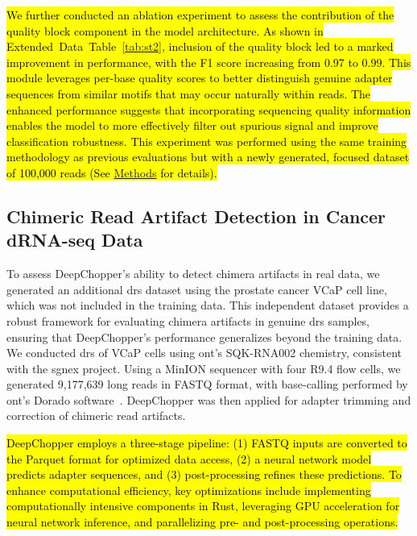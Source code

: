 \documentclass[pdflatex,sn-nature, lineno]{sn-jnl}%
\newcommand{\edtableref}[2]{Extended Data Table~\hyperref[#1]{\ref*{#1}#2}}
\begin{document}
\hl{We further conducted an ablation experiment to assess the contribution of the quality block component in the model architecture.
	As shown in \mbox{\edtableref{tab:st2}{}}, inclusion of the quality block led to a marked improvement in performance, with the F1 score increasing from 0.97 to 0.99.
	This module leverages per-base quality scores to better distinguish genuine adapter sequences from similar motifs that may occur naturally within reads.
	The enhanced performance suggests that incorporating sequencing quality information enables the model to more effectively filter out spurious signal and improve classification robustness.
	This experiment was performed using the same training methodology as previous evaluations but with a newly generated, focused dataset of 100,000 reads (See \mbox{\hyperref[sec:methods]{Methods}} for details).}

\subsection{Chimeric Read Artifact Detection in Cancer dRNA-seq Data}

To assess DeepChopper’s ability to detect chimera artifacts in real data, we generated an additional \gls{drs} dataset using the prostate cancer VCaP cell line, which was not included in the training data.
This independent dataset provides a robust framework for evaluating chimera artifacts in genuine \gls{drs} samples, ensuring that DeepChopper's performance generalizes beyond the training data. We conducted \gls{drs} of VCaP cells using \gls{ont}'s SQK-RNA002 chemistry, consistent with the \gls{sgnex} project. Using a MinION sequencer with four R9.4 flow cells, we generated 9,177,639 long reads in FASTQ format, with base-calling performed by \gls{ont}'s Dorado software~\cite{dorado2023}. DeepChopper was then applied for adapter trimming and correction of chimeric read artifacts.

\hl{DeepChopper employs a three-stage pipeline: (1) FASTQ inputs are converted to the Parquet format for optimized data access, (2) a neural network model predicts adapter sequences, and (3) post-processing refines these predictions. To enhance computational efficiency, key optimizations include implementing computationally intensive components in Rust, leveraging GPU acceleration for neural network inference, and parallelizing pre- and post-processing operations.}
\end{document}
